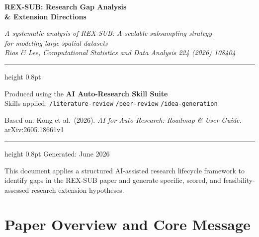 \documentclass[12pt, a4paper]{article}
\begin{document}
\begin{titlepage}
  \centering
  \vspace*{2cm}
  {\Huge\bfseries\color{gapblue}
    REX-SUB: Research Gap Analysis\\[0.4em]
    \& Extension Directions\par}
  \vspace{1.5em}
  {\large\itshape
    A systematic analysis of \emph{REX-SUB: A scalable subsampling strategy\\
    for modeling large spatial datasets}\\[0.3em]
    Rios \& Lee, \emph{Computational Statistics and Data Analysis}
    224 (2026) 108404\par}
  \vspace{2em}
  \hrule height 0.8pt
  \vspace{1em}
  {\normalsize
    Produced using the \textbf{AI Auto-Research Skill Suite}\\
    Skills applied: \texttt{/literature-review} \quad
                    \texttt{/peer-review} \quad
                    \texttt{/idea-generation}\par}
  \vspace{0.5em}
  {\small\color{gray}Based on: Kong et al.\ (2026).
    \emph{AI for Auto-Research: Roadmap \& User Guide.}
    arXiv:2605.18661v1\par}
  \vspace{1em}
  \hrule height 0.8pt
  \vspace{2em}
  {\small Generated: June 2026}
  \vfill
  \begin{tcolorbox}[colback=headerblue, colframe=gapblue, width=0.9\textwidth]
    \centering\small
    This document applies a structured AI-assisted research lifecycle framework
    to identify gaps in the REX-SUB paper and generate specific,
    scored, and feasibility-assessed research extension hypotheses.
  \end{tcolorbox}
\end{titlepage}

\tableofcontents
\newpage

\section{Paper Overview and Core Message}
\end{document}
